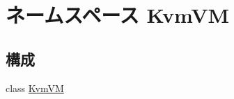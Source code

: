 \hypertarget{namespaceKvmVM}{
\section{ネームスペース KvmVM}
\label{namespaceKvmVM}
}
\subsection*{構成}
\begin{DoxyCompactItemize}
\item 
class \hyperlink{classKvmVM_1_1KvmVM}{KvmVM}
\end{DoxyCompactItemize}
